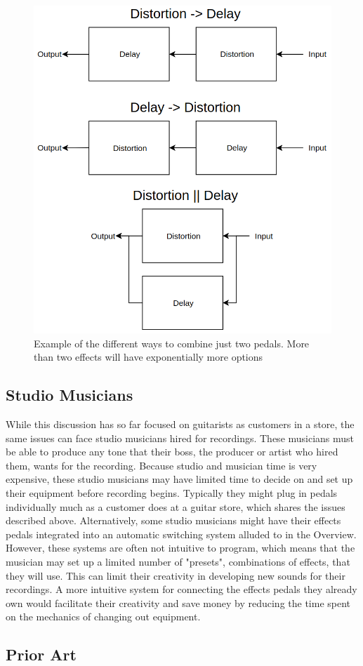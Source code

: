 \documentclass{article}
\begin{document}
	\begin{figure}
		\centering
		\includegraphics[width = 0.4 \textwidth]{PR2Images/RoutingConfigs.png}
		\caption{Example of the different ways to combine just two pedals.  More than two effects will have exponentially more options}
		\label{fig:PedalConnectionTopologies}
	\end{figure}

	\subsection{Studio Musicians}

	While this discussion has so far focused on guitarists as customers in a store, the same issues can face studio musicians hired for recordings.  These musicians must be able to produce any tone that their boss, the producer or artist who hired them, wants for the recording.  Because studio and musician time is very expensive, these studio musicians may have limited time to decide on and set up their equipment before recording begins.  Typically they might plug in pedals individually much as a customer does at a guitar store, which shares the issues described above.  Alternatively, some studio musicians might have their effects pedals integrated into an automatic switching system alluded to in the Overview.  However, these systems are often not intuitive to program, which means that the musician may set up a limited number of "presets", combinations of effects, that they will use.  This can limit their creativity in developing new sounds for their recordings.  A more intuitive system for connecting the effects pedals they already own would facilitate their creativity and save money by reducing the time spent on the mechanics of changing out equipment.
	

	\subsection{Prior Art}
	
\end{document}
